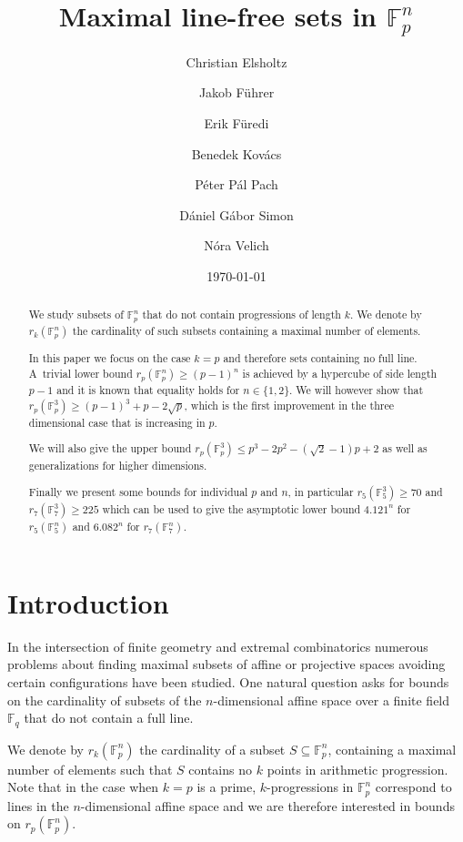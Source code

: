 \documentclass[12pt]{amsart}
\title[Maximal line-free sets in $\mathbb{F}_p^n$]%
  {Maximal line-free sets in $\mathbb{F}_p^n$}
\author[Elsholtz et al.]{Christian Elsholtz}
\author[]{Jakob F\"uhrer}
\author[]{Erik F\"uredi}
\author[]{Benedek Kov\'acs}
\author[]{P\'eter P\'al Pach}
\author[]{D\'aniel G\'abor Simon}
\author[]{N\'ora Velich}
\date{}
\newcommand{\<}{\langle}
\renewcommand{\>}{\rangle}
\numberwithin{equation}{section}
\numberwithin{theorem}{section}
\begin{document}
\begin{abstract}

We study subsets of $\mathbb{F}_p^n$ that do not contain progressions of length $k$. We denote by $r_k(\mathbb{F}_p^n)$ the cardinality of such subsets containing a maximal number of elements.

In this paper we focus on the case $k=p$ and therefore sets containing no full line.
A~trivial lower bound $r_p(\mathbb{F}_p^n)\geq(p-1)^n$ is achieved by a hypercube of side length $p-1$ and it is known that equality holds for $n\in\{1,2\}$. We will however show that $r_p(\mathbb{F}_p^3)\geq (p-1)^3+p-2\sqrt{p}$, which is the first improvement in the three dimensional case that is increasing in $p$. 

We will also give the upper bound $r_p(\mathbb{F}_p^{3})\leq p^3-2p^2-(\sqrt{2}-1)p+2$ as well as generalizations for higher dimensions.

Finally we present some bounds for individual $p$ and $n$, in particular $r_5(\mathbb{F}_5^{3})\geq 70$ and $r_7(\mathbb{F}_7^{3})\geq 225$ which can be used to give the asymptotic lower bound $4.121^n$ for $r_5(\mathbb{F}_5^{n})$ and $6.082^n$ for $r_7(\mathbb{F}_7^{n})$.

	
\end{abstract}



\date{\today}
\maketitle


\section{Introduction}

In the intersection of finite geometry and extremal combinatorics numerous problems about finding maximal subsets of affine or projective spaces avoiding certain configurations have been studied. One natural question asks for bounds on the cardinality of subsets of the $n$-dimensional affine space over a finite field $\mathbb{F}_q$ that do not contain a full line.

We denote by $r_k(\mathbb{F}_p^n)$ the cardinality of a subset $S\subseteq \mathbb{F}_p^n$, containing a maximal number of elements such that $S$ contains no $k$ points in arithmetic progression. Note that in the case when $k=p$ is a prime, $k$-progressions in  $\mathbb{F}_p^n$ correspond to lines in the $n$-dimensional affine space and we are therefore interested in bounds on $r_p(\mathbb{F}_p^n)$.
\end{document}
